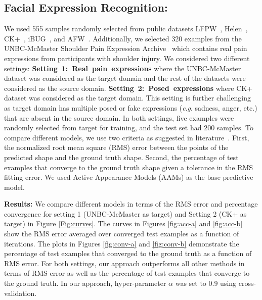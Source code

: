 \documentclass{article}
\newcommand{\eg}{\textit{e}.\textit{g}. }
\begin{document}
\subsection{Facial Expression Recognition:}
\vspace{-.2cm}
We used 555 samples randomly selected from public datasets LFPW~\cite{belhumeur2013localizing}, Helen~\cite{le2012interactive},
CK+~\cite{ck_ex}, iBUG~\cite{sagonas2013300}, and AFW~\cite{zhu2012face}. Additionally, we selected 320 examples from the UNBC-McMaster Shoulder Pain Expression Archive~\cite{lucey2011painful} which contains real pain expressions from participants with shoulder injury. We considered two different settings: \mbox{\textbf{Setting 1: Real pain expressions}} where the UNBC-McMaster dataset was considered as the target domain and the rest of the datasets were considered as the source domain. \mbox{\textbf{Setting 2: Posed expressions}} where CK+ dataset was considered as the target domain. This setting is further challenging as target domain has multiple posed or fake expressions (\eg sadness, anger, etc.) that are absent in the source domain. In both settings, five examples were randomly selected from target for training, and the test set had 200 samples. To compare different models, we use two criteria as suggested in literature~\cite{zhu2012face,matthews2004active}. First, the normalized root mean square (RMS) error between the points of the predicted shape and the ground truth shape. Second, the percentage of test examples that converge to the ground truth shape given a tolerance in the RMS fitting error. We used Active Appearance Models (AAMs) as the base predictive model.

\textbf{Results:}
We compare different models in terms of the RMS error and percentage convergence for  setting 1 (UNBC-McMaster as target) and Setting 2 (CK+ as target) in Figure \ref{Fig:curves}. The curves in Figures \ref{fig:acc-a} and \ref{fig:acc-b} show the RMS error averaged over converged test examples as a function of iterations. The plots in Figures \ref{fig:conv-a} and \ref{fig:conv-b} demonstrate the percentage of test examples that converged to the ground truth as a function of RMS error. For both settings, our approach outperforms all other methods in terms of RMS error as well as the percentage of test examples that converge to the ground truth. In our
approach, hyper-parameter $\alpha$ was set to 0.9 using cross-validation.
\end{document}
